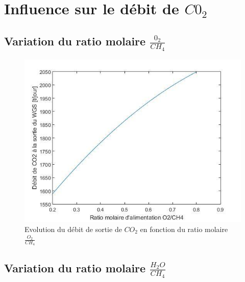 \documentclass[12pt]{report}
\begin{document}
\section{Influence sur le débit de $C0_2$}

\subsection{Variation du ratio molaire $\frac{0_2}{CH_4}$}



\begin{figure}[H]
\begin{center}
\includegraphics[scale=0.6]{debit_CO2_ratio_O2}
\caption{Evolution du débit de sortie de $CO_2$ en fonction du ratio molaire $\frac{O_2}{CH_4}$}
\end{center}
\end{figure}


\subsection{Variation du ratio molaire $\frac{H_2O}{CH_4}$}
\end{document}
